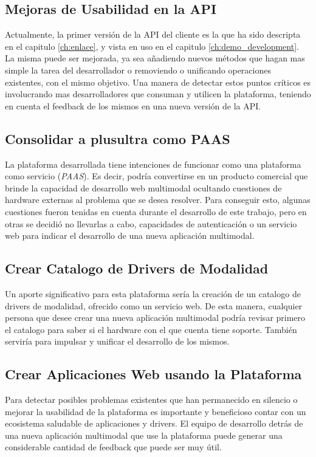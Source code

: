 \subsection{Mejoras de Usabilidad en la API}
Actualmente, la primer versión de la API del cliente es la que ha sido descripta en el capitulo \ref{ch:enlace}, y vista en uso en el capitulo \ref{ch:demo_development}. La misma puede ser mejorada, ya sea añadiendo nuevos métodos que hagan mas simple la tarea del desarrollador o removiendo o unificando operaciones existentes, con el mismo objetivo. Una manera de detectar estos puntos críticos es involucrando mas desarrolladores que consuman y utilicen la plataforma, teniendo en cuenta el feedback de los mismos en una nueva versión de la API.

\subsection{Consolidar a plusultra como PAAS}
La plataforma desarrollada tiene intenciones de funcionar como una plataforma como servicio (\emph{PAAS}). Es decir, podría convertirse en un producto comercial que brinde la capacidad de desarrollo web multimodal ocultando cuestiones de hardware externas al problema que se desea resolver. Para conseguir esto, algunas cuestiones fueron tenidas en cuenta durante el desarrollo de este trabajo, pero en otras se decidió no llevarlas a cabo, \eg capacidades de autenticación o un servicio web para indicar el desarrollo de una nueva aplicación multimodal.

\subsection{Crear Catalogo de Drivers de Modalidad}
Un aporte significativo para esta plataforma sería la creación de un catalogo de drivers de modalidad, ofrecido como un servicio web. De esta manera, cualquier persona que desee crear una nueva aplicación multimodal podría revisar primero el catalogo para saber si el hardware con el que cuenta tiene soporte. También serviría para impulsar y unificar el desarrollo de los mismos.

\subsection{Crear Aplicaciones Web usando la Plataforma}
Para detectar posibles problemas existentes que han permanecido en silencio o mejorar la usabilidad de la plataforma es importante y beneficioso contar con un ecosistema saludable de aplicaciones y drivers. El equipo de desarrollo detrás de una nueva aplicación multimodal que use la plataforma puede generar una considerable cantidad de feedback que puede ser muy útil.

